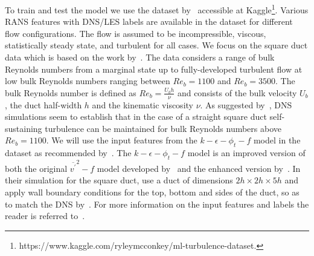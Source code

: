 \documentclass[11pt]{article}
\numberwithin{equation}{section}
\theoremstyle{plain}
\theoremstyle{definition}
\begin{document}
To train and test the model we use the dataset by~\cite{mcconkey2021curated} accessible at Kaggle\footnote{https://www.kaggle.com/ryleymcconkey/ml-turbulence-dataset.}. Various RANS features with DNS/LES labels are available in the dataset for different flow configurations. The flow is assumed to be incompressible, viscous, statistically steady state, and turbulent for all cases. We focus on the square duct data which is based on the work by~\cite{pinelli_uhlmann_sekimoto_kawahara_2010}. The data considers a range of bulk Reynolds numbers from a marginal state up to fully-developed turbulent flow at low bulk Reynolds numbers ranging between $Re_{b}=1100$ and $Re_{b}=3500$. The bulk Reynolds number is defined as $Re_{b} = \frac{U_{b}h}{\nu}$ and consists of the bulk velocity $U_{b}$, the duct half-width $h$ and the
kinematic viscosity $\nu$. As suggested by~\cite{marginal}, DNS simulations seem to establish that in the case of a straight square duct self-sustaining turbulence can be maintained for bulk Reynolds numbers above $Re_{b}=1100$. We will use the input features from the $k-\epsilon-\phi_{t}-f$ model in the dataset as recommended by~\cite{mcconkey2021curated}. The $k-\epsilon-\phi_{t}-f$ model is an improved version of both the original $\overline{v^{\prime}}^{2}-f$ model developed by~\cite{Durbin1991NearwallTC} and the enhanced version by~\cite{lien_version}. In their simulation for the square duct, \cite{mcconkey2021curated} use a duct of dimensions $2h \times 2h \times 5h$ and apply wall boundary conditions for the top, bottom and sides of the
duct, so as to match the DNS by~\cite{pinelli_uhlmann_sekimoto_kawahara_2010}. For more information on the input features and labels the reader is referred to~\cite{mcconkey2021curated}.
\end{document}

